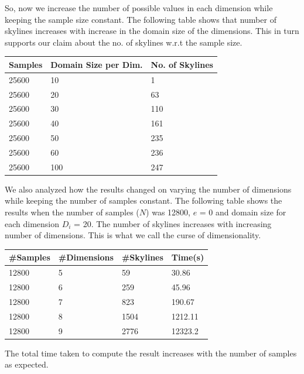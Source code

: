 \documentclass[twocolumn]{article}
\begin{document}
So, now we increase the number of possible values in each dimension while keeping the sample size constant. The following table shows that number of skylines increases with increase in the domain size of the dimensions. This in turn supports our claim about the no. of skylines w.r.t the sample size.

\begin{center}
    \begin{tabular}{ | l | l | l |}
    \hline
    Samples & Domain Size per Dim. & No. of Skylines \\ \hline
    25600 & 10 & 1 \\ \hline
    25600 & 20 & 63 \\ \hline
    25600 & 30 & 110 \\ \hline  
    25600 & 40 & 161 \\ \hline
    25600 & 50 & 235 \\ \hline
    25600 & 60 & 236 \\ \hline
    25600 & 100 & 247 \\ \hline
    \end{tabular}
\end{center}

We also analyzed how the results changed on varying the number of dimensions while keeping the number of samples constant. The following table shows the results when the number of samples ($N$) was 12800, $e$ = 0 and domain size for each dimension $D_i$ = 20. The number of skylines increases with increasing number of dimensions. This is what we call the curse of dimensionality.

\begin{center}
    \begin{tabular}{ | l | l | l | l |}
    \hline
    #Samples & #Dimensions & #Skylines & Time(s) \\ \hline
    12800 & 5 & 59 & 30.86\\ \hline
    12800 & 6 & 259 & 45.96\\ \hline
    12800 & 7 & 823 & 190.67\\ \hline  
    12800 & 8 & 1504 & 1212.11\\ \hline
    12800 & 9 &  2776 & 12323.2\\ \hline
    \end{tabular}
\end{center}


The total time taken to compute the result increases with the number of samples as expected.
\end{document}
